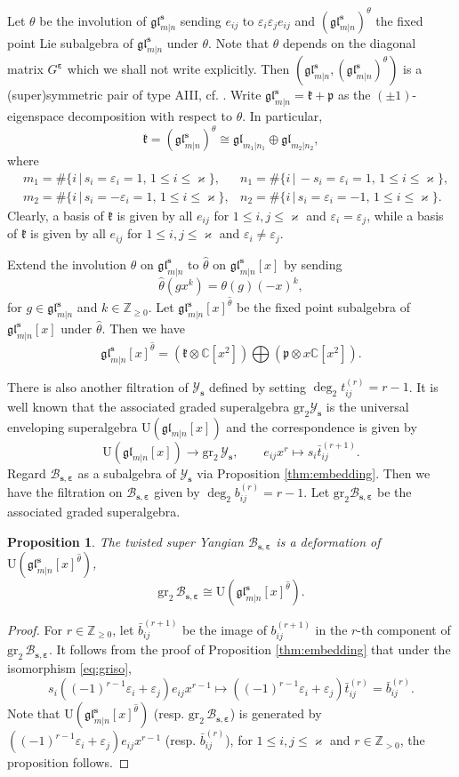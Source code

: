 \documentclass[11pt,reqno]{amsart}
\numberwithin{equation}{section}
\newtheorem{prop}[thm]{Proposition}
\theoremstyle{definition}
\theoremstyle{remark}
\newcommand{\beq}{\begin{equation}}
\newcommand{\eeq}{\end{equation}}
\newcommand{\C}{\mathbb{C}}
\newcommand{\Z}{\mathbb{Z}}
\newcommand{\gl}{\mathfrak{gl}}
\newcommand{\bZ}{\mathbb{Z}}
\newcommand{\gge}{\geqslant}
\newcommand{\lle}{\leqslant}
\newcommand{\glMN}{\mathfrak{gl}_{m|n}^{\bm s}}
\newcommand{\YMN}{{\mathscr{Y}_{\bm s}}}
\newcommand{\BMN}{{\mathscr{B}_{\bm s,\bm \ve}}}
\newcommand{\ka}{\varkappa}
\newcommand{\ve}{\varepsilon}
\begin{document}
Let $\theta$ be the involution of $\glMN$ sending $e_{ij}$ to $\ve_i\ve_j e_{ij}$ and $(\glMN)^\theta$ the fixed point Lie subalgebra of $\glMN$ under $\theta$. Note that $\theta$ depends on the diagonal matrix $G^{\bm\ve}$ which we shall not write explicitly. Then $(\glMN,(\glMN)^\theta)$ is a (super)symmetric pair of type AIII, cf. \cite{Shen2022quantum}. Write $\glMN=\mathfrak k+\mathfrak p$ as the $(\pm 1)$-eigenspace decomposition with respect to $\theta$. In particular,
$$
\mathfrak k=(\glMN)^\theta\cong \gl_{m_1|n_1}\oplus \gl_{m_2|n_2},
$$
where
\begin{align*}
   &m_1=\#\{i\,|\, s_i=\ve_i=1,\, 1\lle i\lle \ka\},&n_1=\#\{i\,|\, -s_i=\ve_i=1,\, 1\lle i\lle \ka\},\\
   &m_2=\#\{i\,|\, s_i=-\ve_i=1,\, 1\lle i\lle \ka\},& n_2=\#\{i\,|\, s_i=\ve_i=-1,\, 1\lle i\lle \ka\}.
\end{align*}
Clearly, a basis of $\mathfrak k$ is given by all $e_{ij}$ for $1\lle i,j\lle\ka$ and $\ve_i=\ve_j$, while a basis of $\mathfrak k$ is given by all $e_{ij}$ for $1\lle i,j\lle\ka$ and $\ve_i\ne\ve_j$.

Extend the involution $\theta$ on $\glMN$ to $\hat\theta$ on $\glMN[x]$ by sending
$$
\hat\theta(gx^k)=\theta(g)(-x)^k,
$$
for $g\in \glMN$ and $k\in\Z_{\gge 0}$. Let $\glMN[x]^{\hat\theta}$ be the fixed point subalgebra of $\glMN[x]$ under $\hat\theta$. Then we have
\[
\glMN[x]^{\hat\theta}=(\mathfrak k\otimes \C[x^2]) \bigoplus (\mathfrak p\otimes x\C[x^2]).
\]

There is also another filtration of $\YMN$ defined by setting $\deg_2 t_{ij}^{(r)}=r-1$. It is well known \cite{Gow2007gauss} that the associated graded superalgebra $\mathrm{gr}_2\YMN$ is the universal enveloping superalgebra $\mathrm{U}(\gl_{m|n}[x])$ and the correspondence is given by
\beq\label{eq:griso}
\mathrm{U}(\gl_{m|n}[x])\to \mathrm{gr}_2\,\YMN, \qquad e_{ij} x^r\mapsto s_i\bar{t}_{ij}^{(r+1)}.
\eeq
Regard $\BMN$ as a subalgebra of $\YMN$ via Proposition \ref{thm:embedding}. Then we have the filtration on $\BMN$ given by $\deg_2 b_{ij}^{(r)}=r-1$. Let $\mathrm{gr}_2\BMN$ be  the associated graded superalgebra.
\begin{prop}\label{prop:limit}
The twisted super Yangian $\BMN$ is a deformation of $\mathrm{U}(\glMN[x]^{\hat\theta})$,
\[
\mathrm{gr}_2\,\BMN\cong \mathrm{U}(\glMN[x]^{\hat\theta}).
\]
\end{prop}
\begin{proof}
For $r\in\Z_{\gge 0}$, let $\bar b_{ij}^{(r+1)}$ be the image of $b_{ij}^{(r+1)}$ in the $r$-th component of $\mathrm{gr}_2\,\BMN$. It follows from the proof of Proposition \ref{thm:embedding} that under the isomorphism \eqref{eq:griso},
\[
s_i((-1)^{r-1}\ve_i+\ve_j)e_{ij}x^{r-1}\mapsto ((-1)^{r-1}\ve_i+\ve_j)\bar{t}_{ij}^{(r)}=\bar b_{ij}^{(r)}.
\]
Note that $\mathrm{U}(\glMN[x]^{\hat\theta})$ (resp. $\mathrm{gr}_2\,\BMN$) is generated by $((-1)^{r-1}\ve_i+\ve_j)e_{ij}x^{r-1}$ (resp. $\bar b_{ij}^{(r)}$), for $1\lle i,j\lle \ka$ and $r\in\bZ_{>0}$, the proposition follows.
\end{proof}
\end{document}
